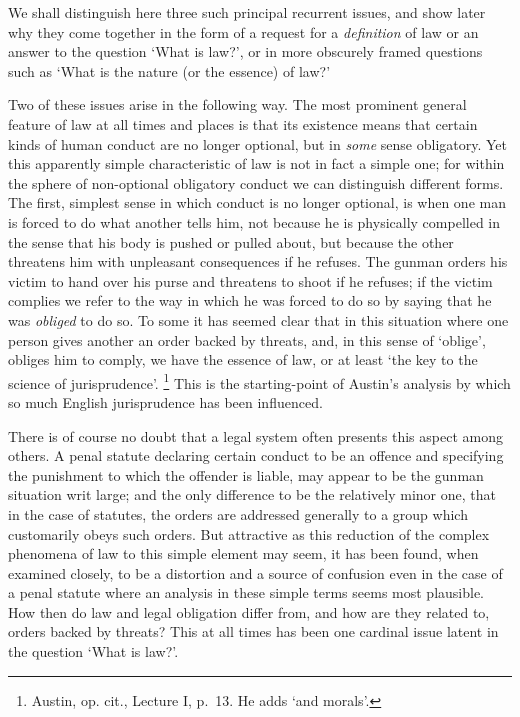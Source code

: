\documentclass[12pt,oneside]{book}  %
\begin{document}
We shall distinguish here three such principal recurrent issues, and
show later why they come together in the form of a request for a
\emph{definition} of law or an answer to the question `What is law?', or
in more obscurely framed questions such as `What is the nature (or the
essence) of law?'

Two of these issues arise in the following way. The most prominent
general feature of law at all times and places is that its existence
means that certain kinds of human conduct are no longer optional, but in
\emph{some} sense obligatory. Yet this apparently simple characteristic
of law is not in fact a simple one; for within the sphere of
non-optional obligatory conduct we can distinguish different forms. The
first, simplest sense in which conduct is no longer optional, is when
one man is forced to do what another tells him, not because he is
physically compelled in the sense that his body is pushed or pulled
about, but because the other threatens him with unpleasant consequences
if he refuses. The gunman orders his victim to hand over his purse and
threatens to shoot if he refuses; if the victim complies we refer to the
way in which he was forced to do so by saying that he was \emph{obliged}
to do so. To some it has seemed clear that in this situation where one
person gives another an order backed by threats, and, in this sense of
`oblige', obliges him to comply, we have the essence of law, or at least
`the key to the science of jurisprudence'. \footnote{Austin, op. cit.,
  Lecture I, p.~13. He adds `and morals'.} This is the starting-point of
Austin's analysis by which so much English jurisprudence has been
influenced.

There is of course no doubt that a legal system often presents this
aspect among others. A penal statute declaring certain conduct to be an
offence and specifying the punishment to which the offender is liable,
may appear to be the gunman situation writ large; and the only
difference to be the relatively minor one, that in the case of statutes,
the orders are addressed generally to a group which customarily obeys
such orders. But attractive as this reduction of the complex phenomena
of law to this simple element may seem, it has been found, when examined
closely, to be a distortion and a source of confusion even in the case
of a penal statute where an analysis in these simple terms seems most
plausible. How then do law and legal obligation differ from, and how are
they related to, orders backed by threats? This at all times has been
one cardinal issue latent in the question `What is law?'.
\end{document}
